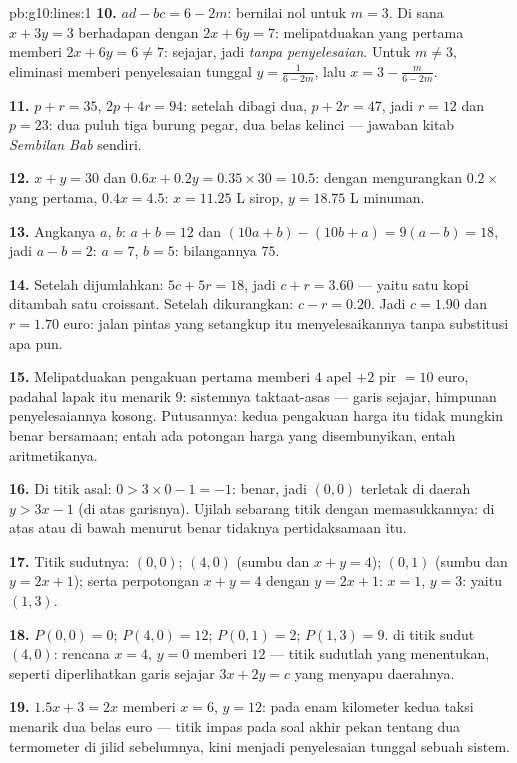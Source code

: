 \begin{solution}{pb:g10:lines:1}
\textbf{10.} $ad - bc = 6 - 2m$: bernilai nol untuk $m = 3$. Di sana
$x + 3y = 3$ berhadapan dengan $2x + 6y = 7$: melipatduakan yang pertama
memberi $2x + 6y = 6 \neq 7$: sejajar, jadi \emph{tanpa penyelesaian}. Untuk
$m \neq 3$, eliminasi memberi penyelesaian tunggal
$y = \frac{1}{6 - 2m}$, lalu $x = 3 - \frac{m}{6 - 2m}$.

\textbf{11.} $p + r = 35$, $2p + 4r = 94$: setelah dibagi dua,
$p + 2r = 47$, jadi $r = 12$ dan $p = 23$: dua puluh tiga burung pegar,
dua belas kelinci --- jawaban kitab \emph{Sembilan Bab} sendiri.

\textbf{12.} $x + y = 30$ dan $0.6x + 0.2y = 0.35 \times 30 =
10.5$: dengan mengurangkan $0.2 \times$ yang pertama, $0.4x = 4.5$:
$x = 11.25$ L sirop, $y = 18.75$ L minuman.

\textbf{13.} Angkanya $a$, $b$: $a + b = 12$ dan
$(10a + b) - (10b + a) = 9(a - b) = 18$, jadi $a - b = 2$:
$a = 7$, $b = 5$: bilangannya $75$.

\textbf{14.} Setelah dijumlahkan: $5c + 5r = 18$, jadi $c + r = 3.60$ ---
yaitu satu kopi ditambah satu croissant. Setelah dikurangkan: $c - r = 0.20$.
Jadi $c = 1.90$ dan $r = 1.70$ euro: jalan pintas yang setangkup itu
menyelesaikannya tanpa substitusi apa pun.

\textbf{15.} Melipatduakan pengakuan pertama memberi $4$ apel $+ 2$
pir $= 10$ euro, padahal lapak itu menarik $9$: sistemnya
taktaat-asas --- garis sejajar, himpunan penyelesaiannya kosong. Putusannya:
kedua pengakuan harga itu tidak mungkin benar bersamaan; entah ada potongan
harga yang disembunyikan, entah aritmetikanya.

\textbf{16.} Di titik asal: $0 > 3 \times 0 - 1 = -1$: benar,
jadi $(0,0)$ terletak di daerah $y > 3x - 1$ (di atas garisnya).
Ujilah sebarang titik dengan memasukkannya: di atas atau di bawah menurut
benar tidaknya pertidaksamaan itu.

\textbf{17.} Titik sudutnya: $(0, 0)$; $(4, 0)$ (sumbu dan
$x + y = 4$); $(0, 1)$ (sumbu dan $y = 2x + 1$); serta perpotongan
$x + y = 4$ dengan $y = 2x + 1$: $x = 1$, $y = 3$: yaitu $(1, 3)$.

\textbf{18.} $P(0,0) = 0$; $P(4, 0) = 12$; $P(0, 1) = 2$;
$P(1, 3) = 9$.  di titik sudut $(4, 0)$: rencana
$x = 4$, $y = 0$ memberi $12$ --- titik sudutlah yang menentukan, seperti
diperlihatkan garis sejajar $3x + 2y = c$ yang menyapu daerahnya.

\textbf{19.} $1.5x + 3 = 2x$ memberi $x = 6$, $y = 12$: pada enam
kilometer kedua taksi menarik dua belas euro --- titik impas pada
soal akhir pekan tentang dua termometer di jilid sebelumnya, kini menjadi
penyelesaian tunggal sebuah sistem.


\end{solution}
